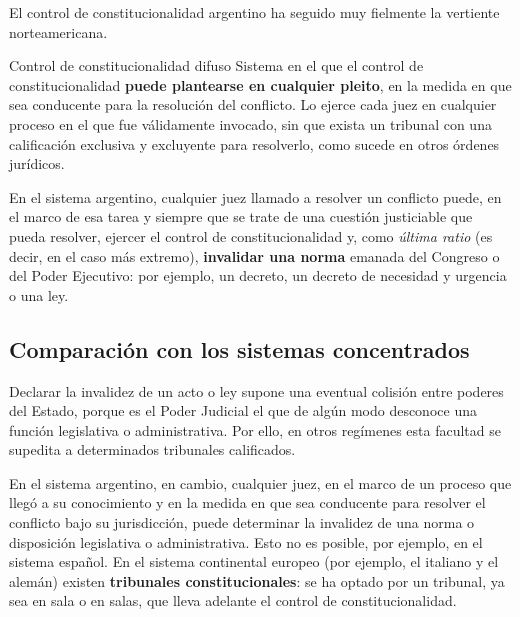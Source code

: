 \documentclass[12pt,oneside]{book}
\begin{document}
El control de constitucionalidad argentino ha seguido muy fielmente la vertiente norteamericana.

\begin{definition}{Control de constitucionalidad difuso}
Sistema en el que el control de constitucionalidad \textbf{puede plantearse en cualquier pleito}, en la medida en que sea conducente para la resolución del conflicto. Lo ejerce cada juez en cualquier proceso en el que fue válidamente invocado, sin que exista un tribunal con una calificación exclusiva y excluyente para resolverlo, como sucede en otros órdenes jurídicos.
\end{definition}

En el sistema argentino, cualquier juez llamado a resolver un conflicto puede, en el marco de esa tarea y siempre que se trate de una cuestión justiciable que pueda resolver, ejercer el control de constitucionalidad y, como \textit{última ratio} (es decir, en el caso más extremo), \textbf{invalidar una norma} emanada del Congreso o del Poder Ejecutivo: por ejemplo, un decreto, un decreto de necesidad y urgencia o una ley.

\subsection{Comparación con los sistemas concentrados}

Declarar la invalidez de un acto o ley supone una eventual colisión entre poderes del Estado, porque es el Poder Judicial el que de algún modo desconoce una función legislativa o administrativa. Por ello, en otros regímenes esta facultad se supedita a determinados tribunales calificados.

En el sistema argentino, en cambio, cualquier juez, en el marco de un proceso que llegó a su conocimiento y en la medida en que sea conducente para resolver el conflicto bajo su jurisdicción, puede determinar la invalidez de una norma o disposición legislativa o administrativa. Esto no es posible, por ejemplo, en el sistema español. En el sistema continental europeo (por ejemplo, el italiano y el alemán) existen \textbf{tribunales constitucionales}: se ha optado por un tribunal, ya sea en sala o en salas, que lleva adelante el control de constitucionalidad.
\end{document}
